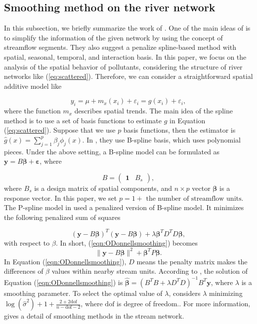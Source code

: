\documentclass[11pt,titlepage]{article}
\begin{document}
\subsection{Smoothing method on the river network}

In this subsection, we briefly summarize the work of \cite{ODonnell2014}. One of the main ideas of \cite{ODonnell2014} is to simplify the information of the given network by using the concept of streamflow segments. They also suggest a penalize spline-based method with spatial, seasonal, temporal, and interaction basis. In this paper, we focus on the analysis of the spatial behavior of pollutants, considering the structure of river networks like (\ref{eq:scattered}). Therefore, we can consider a straightforward spatial additive model like

\begin{equation}\label{eqn:spatialsimpleadditive}
y_{i} = \mu + m_{x}(x_i) + \varepsilon_{i} = g(x_i) + \varepsilon_{i},
\end{equation}
where the function $m_x$ describes spatial trends.
The main idea of the spline method is to use a set of basis functions to estimate $g$ in Equation (\ref{eq:scattered}). Suppose that we use $p$ basis functions, then the estimator is $\hat{g}(x) = \sum_{j=1}^{p}\beta_{j} \phi_{j}(x)$.
In \cite{ODonnell2014}, they use B-spline basis, which uses polynomial pieces. Under the above setting, a B-spline model can be formulated as $\mathbf{y}=B\boldsymbol{\beta} +\boldsymbol{\varepsilon}$,  where

$$
B
= 
\begin{pmatrix}
\mathbf{1} & B_{s}
\end{pmatrix},
$$
where $B_{s}$ is a design matrix of spatial components, and $n\times p$ vector $\boldsymbol{\beta}$ is a response vector. 
In this paper, we set $p=1+\text{ the number of streamflow units}$. 
The P-spline model in \cite{ODonnell2014} used a penalized version of B-spline model. It minimizes the following penalized sum of squares

\begin{equation}\label{eqn:ODonnellsmoothing}
(\mathbf{y}-B\boldsymbol{\beta})^{T}(\mathbf{y}-B\boldsymbol{\beta}) + \lambda\boldsymbol{\beta}^{T}D^{T}D\boldsymbol{\beta},
\end{equation}
with respect to $\beta$. In short, (\ref{eqn:ODonnellsmoothing}) becomes
\[
\|\mathbf{y} - B\boldsymbol{\beta}\|^{2} +\boldsymbol{\beta}^{T}P\boldsymbol{\beta}.
\]
In Equation (\ref{eqn:ODonnellsmoothing}), $D$ means the penalty matrix makes the differences of $\beta$ values within nearby stream units. According to \cite{ODonnell2014}, the solution of Equation (\ref{eqn:ODonnellsmoothing}) is $\hat{\boldsymbol{\beta}} = (B^{T}B+ \lambda D^{T} D)^{-1}B^{T}\mathbf{y}$, where $\lambda$ is a smoothing parameter. To select the optimal value of $\lambda$, \cite{ODonnell2014} considers $\lambda$ minimizing $\log(\hat{\sigma}^{2}) + 1 + \frac{2+2\text{dof}}{n-\text{dof}-2}$, where $\text{dof}$ is degree of freedom..
For more information, \cite{ODonnell2014} gives a detail of smoothing methods in the stream network. %
\end{document}
